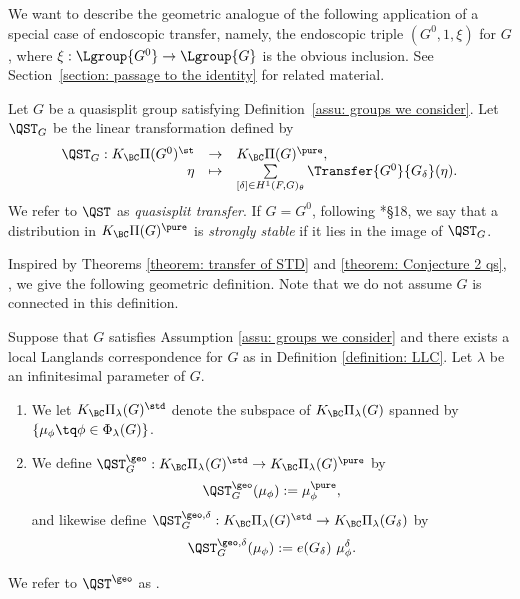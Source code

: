 \documentclass[11pt,letterpaper]{amsart}
\numberwithin{equation}{section}
\begin{document}
We want to describe the geometric analogue of the following application of a special case of endoscopic transfer, namely, the endoscopic triple $(G^0,1,\xi)$ for $G$, where $\xi : \Lgroup{G^0} \to \Lgroup{G}$ is the obvious inclusion. See Section~\ref{section: passage to the identity} for related material.
\begin{definition}\label{definition: QST and z-strongly stable}
Let $G$ be a quasisplit group satisfying Definition~\ref{assu: groups we consider}.
Let $\QST_{G}$ be the linear transformation defined by
\begin{equation}\label{eqn:QST defined}
\begin{array}{rcl}
     \QST_{G}: K_{\BC}\Pi(G^0)^{\st} &\to& K_{\BC}\Pi(G)^{\pure}, \\
     \eta &\mapsto& \sum\limits_{[\delta] \in H^1(F, G)_{\theta}} \Transfer{G^0}{G_{\delta}}(\eta).
\end{array}
\end{equation}
We refer to $\QST$ as {\it quasisplit transfer}.
If $G=G^0$, following \cite{ABV92}*{\S 18}, we say that a distribution in $K_{\BC}\Pi(G)^{\pure}$ is {\it strongly stable} if it lies in the image of $\QST_{G}$. 
\end{definition}


Inspired by Theorems \ref{theorem: transfer of STD} and \ref{theorem: Conjecture 2 qs}, , we give the following geometric definition. Note that we do not assume $G$ is connected in this definition.


\begin{definition}\label{definition: QSTgeo}
Suppose that $G$ satisfies Assumption \ref{assu: groups we consider} and there exists a local Langlands correspondence for $G$ as in Definition \ref{definition: LLC}. 
Let $\lambda$ be an infinitesimal parameter of $G.$    \begin{enumerate}
        \item We let $K_{\BC}\Pi_{\lambda}(G)^{\std}$ denote the subspace of $K_{\BC}\Pi_{\lambda}(G)$ spanned by $\{\mu_{\phi}\tq \phi \in \Phi_{\lambda}(G)\}$.
        \item We define $\QST_G^{\geo}: K_{\BC}\Pi_{\lambda}(G)^{\std} \to K_{\BC}\Pi_{\lambda}(G)^{\pure}$ by
        \[ 
        \QST_G^{\geo}(\mu_{\phi}):= \mu_{\phi}^{\pure},
        \]
    and likewise define $\QST_G^{\geo,\delta}: K_{\BC}\Pi_{\lambda}(G)^{\std} \to K_{\BC}\Pi_{\lambda}(G_\delta)$ by
        \[ 
        \QST_G^{\geo,\delta}(\mu_{\phi}):= e(G_{\delta}) \ \mu_{\phi}^{\delta}.
        \]
    \end{enumerate}
We refer to $\QST^\geo$ as . 
\end{definition}
\end{document}
